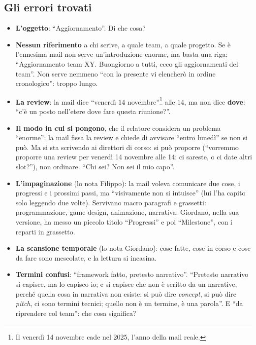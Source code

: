 \subsection{Gli errori trovati}

\begin{itemize}
  \item \textbf{L'oggetto}: ``Aggiornamento''. Di che cosa?
  \item \textbf{Nessun riferimento} a chi scrive, a quale team, a quale
        progetto. Se è l'ennesima mail non serve un'introduzione enorme, ma
        basta una riga: ``Aggiornamento team XY. Buongiorno a tutti, ecco gli
        aggiornamenti del team''. Non serve nemmeno ``con la presente vi
        elencherò in ordine cronologico'': troppo lungo.
  \item \textbf{La review}: la mail dice ``venerdì 14 novembre''\footnote{Il
        venerdì 14 novembre cade nel 2025, l'anno della mail reale.} alle 14, ma
        non dice \textbf{dove}: ``c'è un posto nell'etere dove fare questa
        riunione?''.
  \item \textbf{Il modo in cui si pongono}, che il relatore considera un problema
        ``enorme'': la mail fissa la review e chiede di avvisare ``entro lunedì''
        se non si può. Ma si sta scrivendo ai direttori di corso: si può
        proporre (``vorremmo proporre una review per venerdì 14 novembre alle
        14: ci sareste, o ci date altri slot?''), non ordinare. ``Chi sei? Non
        sei il mio capo''.
  \item \textbf{L'impaginazione} (lo nota Filippo): la mail voleva comunicare
        due cose, i progressi e i prossimi passi, ma ``visivamente non si
        intuisce'' (lui l'ha capito solo leggendo due volte). Servivano
        macro paragrafi e grassetti: programmazione, game design, animazione,
        narrativa. Giordano, nella sua versione, ha messo un piccolo titolo
        ``Progressi'' e poi ``Milestone'', con i reparti in grassetto.
  \item \textbf{La scansione temporale} (lo nota Giordano): cose fatte, cose in
        corso e cose da fare sono mescolate, e la lettura si incasina.
  \item \textbf{Termini confusi}: ``framework fatto, pretesto narrativo''.
        ``Pretesto narrativo si capisce, ma lo capisco io; e si capisce che
        non è scritto da un narrative, perché quella cosa in narrativa non
        esiste: si può dire \emph{concept}, si può dire \emph{pitch}, ci sono
        termini tecnici; quello non è un termine, è una parola''. E ``da
        riprendere col team'': che cosa significa?
\end{itemize}

